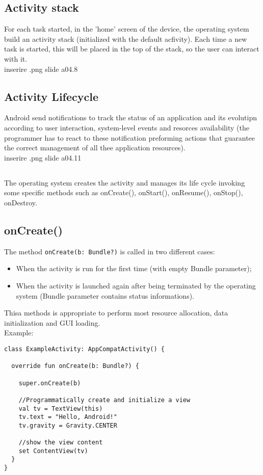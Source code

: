\documentclass[12pt]{article}
\begin{document}
\subsection{Activity stack}
For each task started, in the 'home' screen of the device, the operating system build an activity stack (initialized with the default acfivity). Each time a new task is started, this will be placed in the top of the stack, so the user can interact with it.\\

inserire .png slide a04.8

\subsection{Activity Lifecycle}
Android send notifications to track the status of an application and its evolutipn according to user interaction, system-level events and resorces availability (the programmer has to react to these notification preforming actions that guarantee the correct management of all thee application resources).\\

inserire .png slide a04.11

\subsection{} The operating system creates the activity and manages its life cycle invoking some specific methods such as onCreate(), onStart(), onResume(), onStop(), onDestroy.\\

\subsection{onCreate()}
The method \verb|onCreate(b: Bundle?)| is called in two different cases:
\begin{itemize}
	\item When the activity is run for the first time (with empty Bundle parameter);
	\item When the activity is launched again after being terminated by the operating system (Bundle parameter contains status informations).
\end{itemize}
Thisa methods is appropriate to perform most resource allocation, data initialization and GUI loading.\\
Example:
\begin{verbatim}
class ExampleActivity: AppCompatActivity() {
  
  override fun onCreate(b: Bundle?) {

    super.onCreate(b)

    //Programmatically create and initialize a view
    val tv = TextView(this)
    tv.text = "Hello, Android!"
    tv.gravity = Gravity.CENTER

    //show the view content
    set	ContentView(tv) 
  }
}
\end{verbatim}
\end{document}
